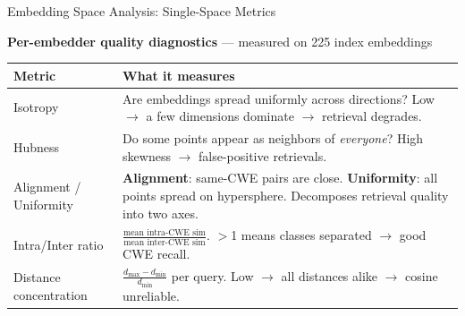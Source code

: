 \documentclass[aspectratio=169,10pt]{beamer}
\begin{document}
\begin{frame}{Embedding Space Analysis: Single-Space Metrics}

  \textbf{\textcolor{c1}{Per-embedder quality diagnostics}} — measured on 225 index embeddings

  \vspace{0.5em}
  {\scriptsize
  \renewcommand{\arraystretch}{1.25}
  \begin{tabular}{p{3.0cm}p{10.5cm}}
    \toprule
    \textbf{Metric} & \textbf{What it measures} \\
    \midrule
    Isotropy
      & Are embeddings spread uniformly across directions?
        Low $\to$ a few dimensions dominate $\to$ retrieval degrades. \\
    Hubness
      & Do some points appear as neighbors of \emph{everyone}?
        High skewness $\to$ false-positive retrievals. \\
    Alignment / Uniformity
      & \textbf{Alignment}: same-CWE pairs are close.
        \textbf{Uniformity}: all points spread on hypersphere.
        Decomposes retrieval quality into two axes. \\
    Intra/Inter ratio
      & $\frac{\text{mean intra-CWE sim}}{\text{mean inter-CWE sim}}$.
        $>$1 means classes separated $\to$ good CWE recall. \\
    Distance concentration
      & $\frac{d_{\max} - d_{\min}}{d_{\min}}$ per query.
        Low $\to$ all distances alike $\to$ cosine unreliable. \\
    \bottomrule
  \end{tabular}}

\end{frame}
\end{document}
